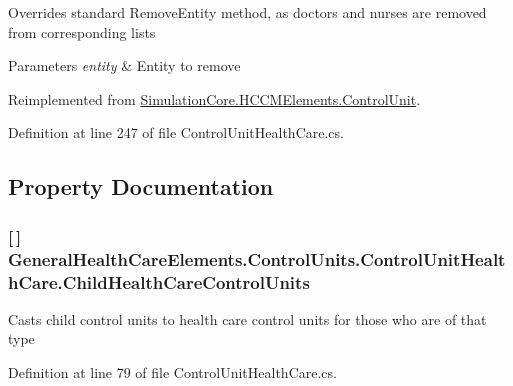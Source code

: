 Overrides standard Remove\+Entity method, as doctors and nurses are removed from corresponding lists 


\begin{DoxyParams}{Parameters}
{\em entity} & Entity to remove\\
\hline
\end{DoxyParams}


Reimplemented from \hyperlink{class_simulation_core_1_1_h_c_c_m_elements_1_1_control_unit_a00aeb796f1372d4aba9d2f1433696326}{Simulation\+Core.\+H\+C\+C\+M\+Elements.\+Control\+Unit}.



Definition at line 247 of file Control\+Unit\+Health\+Care.\+cs.



\subsection{Property Documentation}
\subsubsection[{\texorpdfstring{Child\+Health\+Care\+Control\+Units}{ChildHealthCareControlUnits}}]{ \mbox{[}$\,$\mbox{]} General\+Health\+Care\+Elements.\+Control\+Units.\+Control\+Unit\+Health\+Care.\+Child\+Health\+Care\+Control\+Units\hspace{0.3cm}{\ttfamily [get]}}\hypertarget{class_general_health_care_elements_1_1_control_units_1_1_control_unit_health_care_af0df1c8b2d9d10ee0217c750ab0b0567}{}\label{class_general_health_care_elements_1_1_control_units_1_1_control_unit_health_care_af0df1c8b2d9d10ee0217c750ab0b0567}


Casts child control units to health care control units for those who are of that type 



Definition at line 79 of file Control\+Unit\+Health\+Care.\+cs.

